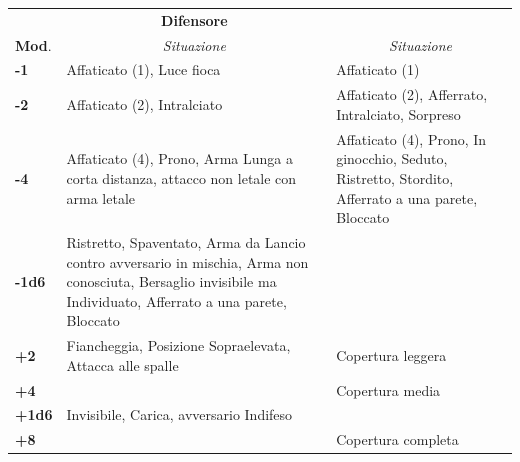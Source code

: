 \noindent\begin{tabularx}{\linewidth}{l|X|X}
	\toprule
 \rowcolor{gray!20}\multicolumn{2}{c}{\textbf{Attaccante}}&\multicolumn{1}{c}{\textbf{Difensore}}\\
\textbf{Mod}.&\multicolumn{1}{c}{\emph{Situazione}}&\multicolumn{1}{c}{\emph{Situazione}}\\
\toprule
\rowcolor{gray!20}\textbf{-1}& Affaticato (1), Luce fioca&Affaticato (1)\\

\textbf{-2}& Affaticato (2), Intralciato & Affaticato (2), Afferrato, Intralciato, Sorpreso\\

\rowcolor{gray!20}\textbf{-4}& Affaticato (4), Prono, Arma Lunga a corta distanza, attacco non letale con arma letale& Affaticato (4), Prono, In ginocchio, Seduto, Ristretto, Stordito, Afferrato a una parete, Bloccato\\

\textbf{-1d6}& Ristretto, Spaventato, Arma da Lancio contro avversario in mischia, Arma non conosciuta, Bersaglio invisibile ma Individuato, Afferrato a una parete, Bloccato&\\

%
\rowcolor{gray!20}\textbf{+2}& Fiancheggia, Posizione Sopraelevata, Attacca alle spalle& Copertura leggera\\

\textbf{+4}&& Copertura media\\

\rowcolor{gray!20}\textbf{+1d6}& Invisibile, Carica, avversario Indifeso& \\

\textbf{+8}&& Copertura completa
\end{tabularx}

\medskip

